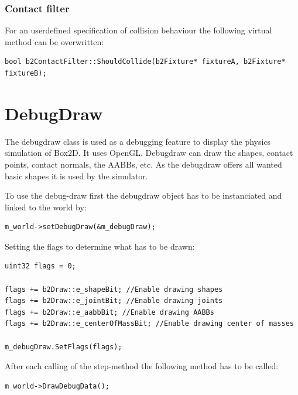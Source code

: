 \documentclass[10pt,a4paper,DIV=11]{scrreprt}
\begin{document}
\subsubsection*{Contact filter}
For an userdefined specification of collision behaviour the following virtual method can be overwritten: \\
\begin{lstlisting}[caption={The contact filter method},label=lst:box2d-contactfiler]
bool b2ContactFilter::ShouldCollide(b2Fixture* fixtureA, b2Fixture* fixtureB);
\end{lstlisting}


\section{DebugDraw}
The debugdraw class is used as a debugging feature to display the physics simulation of Box2D. It uses OpenGL. Debugdraw can draw the shapes, contact points, contact normals, the AABBs, etc.
As the debugdraw offers all wanted basic shapes it is used by the simulator.

To use the debug-draw first the debugdraw object has to be instanciated and linked to the world by: \\

\begin{lstlisting}[caption={Registering a debugdraw instance to the world instance},label=lst:box2d-ddrawset]
m_world->setDebugDraw(&m_debugDraw);
\end{lstlisting}

Setting the flags to determine what has to be drawn:

\begin{lstlisting}[caption={Initializing DebugDraw},label=lst:box2d-ddrawinit]
uint32 flags = 0;

flags += b2Draw::e_shapeBit; //Enable drawing shapes
flags += b2Draw::e_jointBit; //Enable drawing joints
flags += b2Draw::e_aabbBit; //Enable drawing AABBs
flags += b2Draw::e_centerOfMassBit; //Enable drawing center of masses

m_debugDraw.SetFlags(flags);
\end{lstlisting}


After each calling of the step-method the following method has to be called: \\

\begin{lstlisting}[caption={Using debugdraw after each step},label=lst:box2d-ddraw]
m_world->DrawDebugData();
\end{lstlisting}
\end{document}
